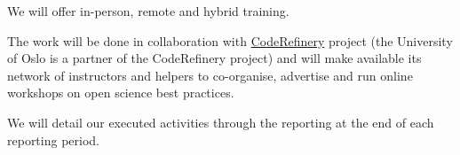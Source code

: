 \begin{task}[
  title=Training Workshops for more reproducible science,
  id=workshops,
  lead=UIO,
  PM=9,
  partners={SRL,MP,IFR}
]
\begin{compactitem}
   \item We will offer in-person, remote and hybrid training.

   \item The work will be done in collaboration with
     \href{https://coderefinery.org}{CodeRefinery} project (the University of Oslo is a partner of the CodeRefinery project) 
     and will make available its network of instructors and helpers
     to co-organise, advertise and run online workshops on open science best practices. 

  \item We will detail our executed activities through the reporting at the end of
    each reporting period.
  \end{compactitem}
\end{task}
